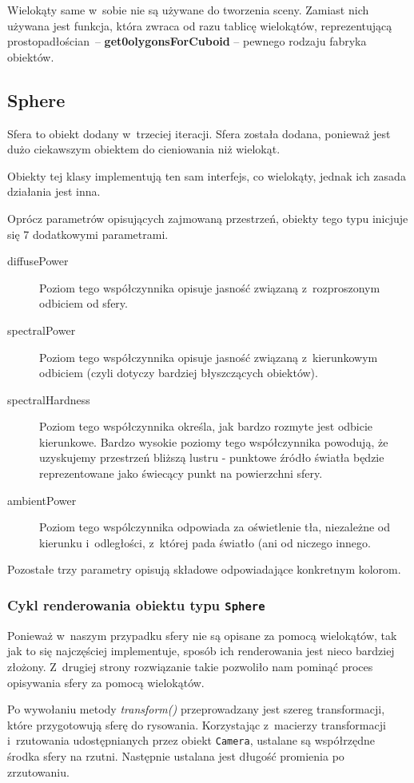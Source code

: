 \documentclass[a4paper]{article}
\begin{document}
{Wielokąty same w~sobie nie są używane do tworzenia sceny.
Zamiast nich używana jest funkcja, która zwraca od razu tablicę wielokątów, reprezentującą prostopadłościan~-- \textbf{get0olygonsForCuboid} -- pewnego rodzaju fabryka obiektów.

\subsection{Sphere}
Sfera to obiekt dodany w~trzeciej iteracji.
Sfera została dodana, ponieważ jest dużo ciekawszym obiektem do cieniowania niż wielokąt.

Obiekty tej klasy implementują ten sam interfejs, co wielokąty, jednak ich zasada działania jest inna.

Oprócz parametrów opisujących zajmowaną przestrzeń, obiekty tego typu inicjuje się 7 dodatkowymi parametrami.
\begin{description}
  \item[diffusePower] Poziom tego współczynnika opisuje jasność związaną z~rozproszonym odbiciem od sfery.
  \item[spectralPower] Poziom tego współczynnika opisuje jasność związaną z~kierunkowym odbiciem (czyli dotyczy bardziej błyszczących obiektów).
  \item[spectralHardness] Poziom tego współczynnika określa, jak bardzo rozmyte jest odbicie kierunkowe.
    Bardzo wysokie poziomy tego współczynnika powodują, że uzyskujemy przestrzeń bliższą lustru - punktowe źródło światła będzie reprezentowane jako świecący punkt na powierzchni sfery.
  \item[ambientPower] Poziom tego wspólczynnika odpowiada za oświetlenie tła, niezależne od kierunku i~odległości, z~której pada światło (ani od niczego innego.
\end{description}

Pozostałe trzy parametry opisują składowe odpowiadające konkretnym kolorom.

\subsubsection{Cykl renderowania obiektu typu \texttt{Sphere}}
Ponieważ w~naszym przypadku sfery nie są opisane za pomocą wielokątów, tak jak to się najczęściej implementuje, sposób ich renderowania jest nieco bardziej złożony.
Z~drugiej strony rozwiązanie takie pozwoliło nam pominąć proces opisywania sfery za pomocą wielokątów.

Po wywołaniu metody \emph{transform()} przeprowadzany jest szereg transformacji, które przygotowują sferę do rysowania.
Korzystając z~macierzy transformacji i~rzutowania udostępnianych przez obiekt \texttt{Camera}, ustalane są współrzędne środka sfery na rzutni.
Następnie ustalana jest długość promienia po zrzutowaniu.

}
\end{document}
